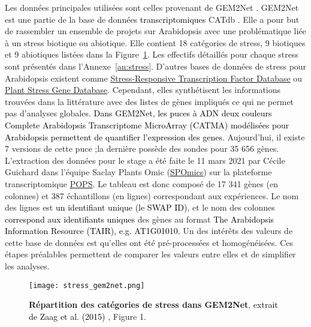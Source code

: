 \documentclass[twoside]{article}
\newcommand{\AR}[1]{\textcolor{black}{#1}}
\begin{document}
    Les données principales utilisées sont celles provenant de GEM2Net \cite{zaag_gem2net_2015}. GEM2Net est une partie de la base de données \AR{transcriptomiques} CATdb \cite{gagnot_catdb_2008}. Elle a pour but de rassembler un ensemble de projets sur Arabidopsis avec une problématique liée à un stress biotique ou abiotique. Elle contient 18 catégories de stress, 9 biotiques et 9 abiotiques listées dans la Figure~\ref{fig:pie}. Les effectifs détaillés pour chaque stress sont présentés dans l'Annexe~\ref{an:stress}. D'autres bases de données de stress pour Arabidopsis existent comme \href{http://caps.ncbs.res.in/stifdb/}{\underline{Stress-Responsive Transcription Factor Database}} ou \href{http://ccbb.jnu.ac.in/stressgenes/}{\underline{Plant Stress Gene Database}}. Cependant, elles synthétisent les informations trouvées dans la littérature avec des listes de gènes impliqués ce qui ne permet pas d'analyses globales. \AR{Dans GEM2Net, les puces à ADN deux couleurs \AR{Complete Arabidopsis Transcriptome MicroArray (CATMA)}  modélisées pour Arabidopsis permettent de quantifier l'expression des genes}. Aujourd'hui, il existe 7 versions de cette puce ;la dernière possède des sondes pour 35 656 gènes.
    L'extraction des données pour le stage a été faite le 11 mars 2021 par Cécile Guichard dans l’équipe Saclay Plants Omic (\href{https://ips2.u-psud.fr/en/platforms/spomics-interactomics-metabolomics-transcriptomics.html}{\underline{SPOmics}}) sur la plateforme transcriptomique \href{https://ips2.u-psud.fr/fr/plateformes/spomics-interatome-metabolome-transcriptome/pops-plateforme-transcriptomique.html}{\underline{POPS}}. Le tableau est donc composé de 17 341 gènes (en colonnes) et 387 échantillons (en lignes) correspondant aux expériences. Le nom des lignes est \AR{un identifiant unique (le SWAP ID)}, et le nom des colonnes \AR{correspond aux identifiants uniques} des gènes au format \AR{The Arabidopsis Information Resource (TAIR), e.g. AT1G01010.} Un des intérêts des valeurs de cette base de données est qu'elles ont été pré-processées et homogénéisées. Ces étapes préalables permettent de comparer les valeurs entre elles et de simplifier les analyses.
    
    \begin{figure}[!h]
    \centering
        \texttt{[image: stress\_gem2net.png]}
        \caption[Effectifs stress GEM2Net]{\label{fig:pie}\textbf{Répartition des catégories de stress dans GEM2Net}, \AR{extrait de Zaag et al. (2015)}  \cite{zaag_gem2net_2015}, Figure 1.}
    \end{figure}
    
\end{document}
